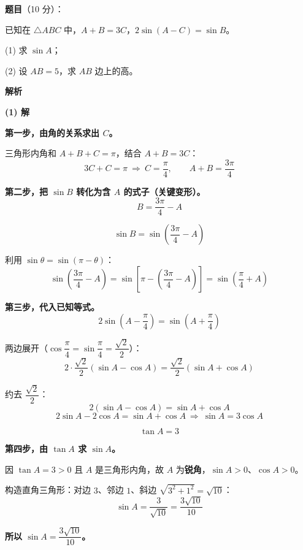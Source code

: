 \begin{answer}

\textbf{题目}（10 分）：

已知在 $\triangle ABC$ 中，$A+B=3C$，$2\sin(A-C)=\sin B$。

  (1) 求 $\sin A$；

  (2) 设 $AB=5$，求 $AB$ 边上的高。

\textbf{解析}

\par\medskip

\textbf{(1) 解}

\textbf{第一步，由角的关系求出 $C$。}

三角形内角和 $A+B+C=\pi$，结合 $A+B=3C$：
\nopagebreak[4]
\[3C+C=\pi\ \Longrightarrow\ C=\frac\pi4,\qquad A+B=\frac{3\pi}4\]

\textbf{第二步，把 $\sin B$ 转化为含 $A$ 的式子（关键变形）。}
\nopagebreak[4]
\[B=\frac{3\pi}4-A\]

\nopagebreak[4]
\[\sin B=\sin\left(\frac{3\pi}4-A\right)\]

利用 $\sin\theta=\sin(\pi-\theta)$：
\nopagebreak[4]
\[\sin\left(\frac{3\pi}4-A\right)=\sin\left[\pi-\left(\frac{3\pi}4-A\right)\right]=\sin\left(\frac\pi4+A\right)\]

\textbf{第三步，代入已知等式。}
\nopagebreak[4]
\[2\sin\left(A-\frac\pi4\right)=\sin\left(A+\frac\pi4\right)\]

两边展开（$\cos\dfrac\pi4=\sin\dfrac\pi4=\dfrac{\sqrt2}2$）：
\nopagebreak[4]
\[2\cdot\frac{\sqrt2}2\left(\sin A-\cos A\right)=\frac{\sqrt2}2\left(\sin A+\cos A\right)\]

约去 $\dfrac{\sqrt2}2$：
\nopagebreak[4]
\[2\left(\sin A-\cos A\right)=\sin A+\cos A\]
\nopagebreak[4]
\[2\sin A-2\cos A=\sin A+\cos A\ \Longrightarrow\ \sin A=3\cos A\]

\nopagebreak[4]
\[\tan A=3\]

\textbf{第四步，由 $\tan A$ 求 $\sin A$。}

因 $\tan A=3>0$ 且 $A$ 是三角形内角，故 $A$ 为\textbf{锐角}，$\sin A>0$、$\cos A>0$。

构造直角三角形：对边 $3$、邻边 $1$、斜边 $\sqrt{3^{2}+1^{2}}=\sqrt{10}$：
\nopagebreak[4]
\[\sin A=\frac3{\sqrt{10}}=\frac{3\sqrt{10}}{10}\]

\textbf{所以 $\sin A=\dfrac{3\sqrt{10}}{10}$。}


\end{answer}

